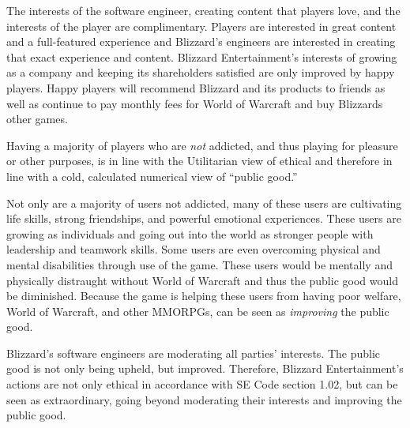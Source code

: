 \documentclass[11pt]{article}
\begin{document}
\begin{multicols}{2}
The interests of the software engineer, creating content that players love, and the interests of the player are complimentary. Players are interested in great content and a full-featured experience and Blizzard's engineers are interested in creating that exact experience and content.
Blizzard Entertainment's interests of growing as a company and keeping its shareholders satisfied are only improved by happy players. Happy players will recommend Blizzard and its products to friends as well as continue to pay monthly fees for World of Warcraft and buy Blizzards other games.

Having a majority of players who are \emph{not} addicted, and thus playing for pleasure or other purposes, is in line with the Utilitarian view of ethical and therefore in line with a cold, calculated numerical view of ``public good.''

Not only are a majority of users not addicted, many of these users are cultivating life skills, strong friendships, and powerful emotional experiences. These users are growing as individuals and going out into the world as stronger people with leadership and teamwork skills.
Some users are even overcoming physical and mental disabilities through use of the game. These users would be mentally and physically distraught without World of Warcraft and thus the public good would be diminished. Because the game is helping these users from having poor welfare, World of Warcraft, and other MMORPGs, can be seen as \emph{improving} the public good.

Blizzard's software engineers are moderating all parties' interests. The public good is not only being upheld, but improved. Therefore, Blizzard Entertainment's actions are not only ethical in accordance with SE Code section 1.02, but can be seen as extraordinary, going beyond moderating their interests and improving the public good.

\end{multicols}
\newpage




\end{document}
